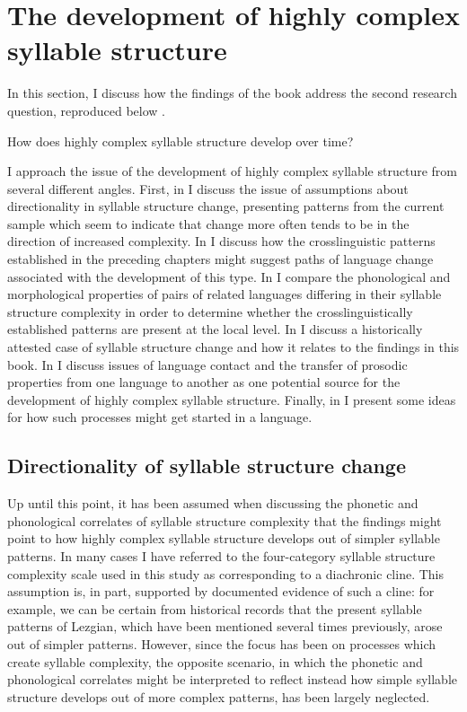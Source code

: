 \section{The development of highly complex syllable structure}\label{sec:8.4}

  In this section, I discuss how the findings of the book address the second research question, reproduced below .

\ea\label{ex:8.2}
    {How does highly complex syllable structure develop over time?}
\z

  I approach the issue of the development of highly complex syllable structure from several different angles. First, in  I discuss the issue of assumptions about directionality in syllable structure change, presenting patterns from the current sample which seem to indicate that change more often tends to be in the direction of increased complexity. In  I discuss how the crosslinguistic patterns established in the preceding chapters might suggest paths of language change associated with the development of this type. In  I compare the phonological and morphological properties of pairs of related languages differing in their syllable structure complexity in order to determine whether the crosslinguistically established patterns are present at the local level. In  I discuss a historically attested case of syllable structure change and how it relates to the findings in this book. In  I discuss issues of language contact and the transfer of prosodic properties from one language to another as one potential source for the development of highly complex syllable structure. Finally, in  I present some ideas for how such processes might get started in a language.

\subsection{Directionality of syllable structure change}\label{sec:8.4.1}

  Up until this point, it has been assumed when discussing the phonetic and phonological correlates of syllable structure complexity that the findings might point to how highly complex syllable structure develops out of simpler syllable patterns. In many cases I have referred to the four-category syllable structure complexity scale used in this study as corresponding to a diachronic cline. This assumption is, in part, supported by documented evidence of such a cline: for example, we can be certain from historical records that the present syllable patterns of Lezgian, which have been mentioned several times previously, arose out of simpler patterns. However, since the focus has been on processes which create syllable complexity, the opposite scenario, in which the phonetic and phonological correlates might be interpreted to reflect instead how simple syllable structure develops out of more complex patterns, has been largely neglected.

